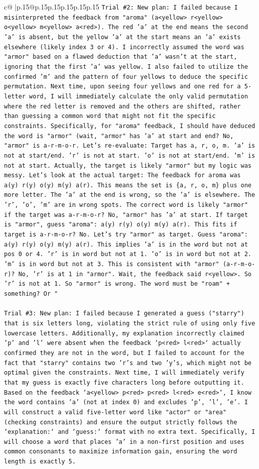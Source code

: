 \documentclass{article}
\begin{document}
{\begin{supertabular}{c@{$\;$}|p{.15\linewidth}@{}p{.15\linewidth}p{.15\linewidth}p{.15\linewidth}p{.15\linewidth}p{.15\linewidth}}
{{{\texttt{Trial \#2: New plan: I failed because I misinterpreted the feedback from "aroma" (a<yellow> r<yellow> o<yellow> m<yellow> a<red>). The red 'a' at the end means the second 'a' is absent, but the yellow 'a' at the start means an 'a' exists elsewhere (likely index 3 or 4). I incorrectly assumed the word was "armor" based on a flawed deduction that 'a' wasn't at the start, ignoring that the first 'a' was yellow. I also failed to utilize the confirmed 'm' and the pattern of four yellows to deduce the specific permutation. Next time, upon seeing four yellows and one red for a 5{-}letter word, I will immediately calculate the only valid permutation where the red letter is removed and the others are shifted, rather than guessing a common word that might not fit the specific constraints. Specifically, for "aroma" feedback, I should have deduced the word is "armor" (wait, "armor" has 'a' at start and end? No, "armor" is a{-}r{-}m{-}o{-}r. Let's re{-}evaluate: Target has a, r, o, m. 'a' is not at start/end. 'r' is not at start. 'o' is not at start/end. 'm' is not at start. Actually, the target is likely "armor" but my logic was messy. Let's look at the actual target: The feedback for aroma was a(y) r(y) o(y) m(y) a(r). This means the set is \{a, r, o, m\} plus one more letter. The 'a' at the end is wrong, so the 'a' is elsewhere. The 'r', 'o', 'm' are in wrong spots. The correct word is likely "armor" if the target was a{-}r{-}m{-}o{-}r? No, "armor" has 'a' at start. If target is "armor", guess "aroma": a(y) r(y) o(y) m(y) a(r). This fits if target is a{-}r{-}m{-}o{-}r? No. Let's try "armor" as target. Guess "aroma": a(y) r(y) o(y) m(y) a(r). This implies 'a' is in the word but not at pos 0 or 4. 'r' is in word but not at 1. 'o' is in word but not at 2. 'm' is in word but not at 3. This is consistent with "armor" (a{-}r{-}m{-}o{-}r)? No, 'r' is at 1 in "armor". Wait, the feedback said r<yellow>. So 'r' is not at 1. So "armor" is wrong. The word must be "roam" + something? Or "} \\
\\ 
\texttt{Trial \#3: New plan: I failed because I generated a guess ("starry") that is six letters long, violating the strict rule of using only five lowercase letters. Additionally, my explanation incorrectly claimed 'p' and 'l' were absent when the feedback `p<red> l<red>` actually confirmed they are not in the word, but I failed to account for the fact that "starry" contains two 'r's and two 'y's, which might not be optimal given the constraints. Next time, I will immediately verify that my guess is exactly five characters long before outputting it. Based on the feedback `a<yellow> p<red> p<red> l<red> e<red>`, I know the word contains 'a' (not at index 0) and excludes 'p', 'l', 'e'. I will construct a valid five{-}letter word like "actor" or "area" (checking constraints) and ensure the output strictly follows the `explanation:` and `guess:` format with no extra text. Specifically, I will choose a word that places 'a' in a non{-}first position and uses common consonants to maximize information gain, ensuring the word length is exactly 5.} \\
}}}
\end{supertabular}}
\end{document}
